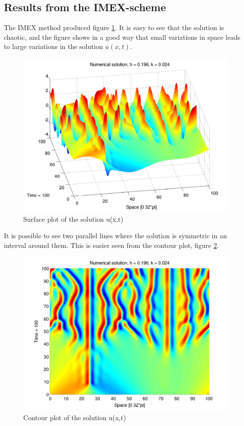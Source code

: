 \subsection{Results from the IMEX-scheme}
The IMEX method produced figure \ref{fig:surface}. It is easy to see that the solution is chaotic, and the figure shows in a good way that small variations in space leads to large variations in the solution $u(x,t)$.

\begin{figure}[H]
\centering
\includegraphics[scale=0.7]
{../PDFs/IMEX/KS_plot_surface.pdf}
\caption{Surface plot of the solution u(x,t)}
\label{fig:surface}
\end{figure}

It is possible to see two parallel lines where the solution is symmetric in an interval around them. This is easier seen from the contour plot, figure \ref{fig:contour}.

\begin{figure}[H]
\centering
\includegraphics[scale=0.65]
{../PDFs/IMEX/KS_plot_contour.pdf}
\caption{Contour plot of the solution u(x,t)}
\label{fig:contour}
\end{figure}

